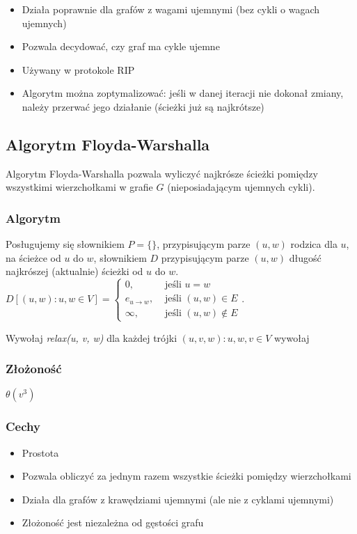 \documentclass[main.tex]{subfiles}
\begin{document}
    \begin{itemize}
        \item Działa poprawnie dla grafów z wagami ujemnymi (bez cykli o wagach ujemnych)
        \item Pozwala decydować, czy graf ma cykle ujemne
        \item Używany w protokole RIP
        \item Algorytm można zoptymalizować: jeśli w danej iteracji nie dokonał zmiany,
        należy przerwać jego działanie (ścieżki już są najkrótsze)
    \end{itemize}

    \subsection{Algorytm Floyda-Warshalla}

    Algorytm Floyda-Warshalla pozwala wyliczyć najkrósze ścieżki pomiędzy wszystkimi
    wierzchołkami w grafie $G$ (nieposiadającym ujemnych cykli).

    \subsubsection{Algorytm}

    Posługujemy się słownikiem $P = \{\}$, przypisującym parze $(u, w)$ rodzica dla $u$,
    na ścieżce od $u$ do $w$, słownikiem $D$ przypisującym parze $(u, w)$ długość
    najkrószej (aktualnie) ścieżki od $u$ do $w$.\\
    $D[(u, w) : u, w \in V] =
    \begin{cases}
        0, &\text{ jeśli } u = w\\
        e_{u \rightarrow w}, &\text{ jeśli } (u, w) \in E\\
        \infty, &\text{ jeśli } (u, w) \notin E
    \end{cases}$.
    \[\]

    Wywołaj  \textit{relax(u, v, w)} dla każdej trójki $(u, v, w) : u, w, v \in V$ wywołaj
    \subsubsection{Złożoność}
    $\theta(v^3)$

    \subsubsection{Cechy}
    \begin{itemize}
        \item Prostota
        \item Pozwala obliczyć za jednym razem wszystkie ścieżki pomiędzy wierzchołkami
        \item Działa dla grafów z krawędziami ujemnymi (ale nie z cyklami ujemnymi)
        \item Złożoność jest niezależna od gęstości grafu
    \end{itemize}
\end{document}
